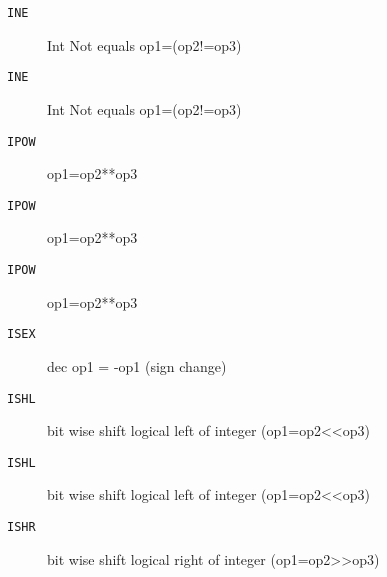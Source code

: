 
\begin{description}
\item[\texttt{INE        }]  Int Not equals op1=(op2!=op3)\\
\end{description}

\begin{description}
\item[\texttt{INE        }]  Int Not equals op1=(op2!=op3)\\
\end{description}

\begin{description}
\item[\texttt{IPOW       }]  op1=op2**op3\\
\end{description}

\begin{description}
\item[\texttt{IPOW       }]  op1=op2**op3\\
\end{description}

\begin{description}
\item[\texttt{IPOW       }]  op1=op2**op3\\
\end{description}

\begin{description}
\item[\texttt{ISEX       }]  dec op1 = -op1 (sign change)\\
\end{description}

\begin{description}
\item[\texttt{ISHL       }]  bit wise shift logical left of integer (op1=op2<<op3)\\
\end{description}

\begin{description}
\item[\texttt{ISHL       }]  bit wise shift logical left of integer (op1=op2<<op3)\\
\end{description}

\begin{description}
\item[\texttt{ISHR       }]  bit wise shift logical right of integer (op1=op2>>op3)\\
\end{description}

